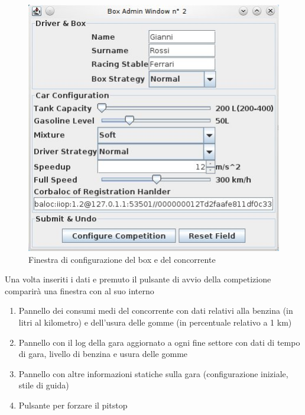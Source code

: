 \begin{center}
\begin{figure}[H]
	\includegraphics[scale=0.75]{screenshotRelazione/box2.jpeg}
	\caption{Finestra di  configurazione del box e del concorrente}
\end{figure}
\end{center}
Una volta inseriti i dati e premuto il pulsante di avvio della competizione comparir\`{a} una finestra con al suo interno 
\begin{enumerate}
\item Pannello dei consumi medi del concorrente con dati relativi alla benzina (in litri al kilometro) e dell'usura delle gomme (in percentuale relativo a 1 km)
\item Pannello con il log della gara aggiornato a ogni fine settore con dati di tempo di gara, livello di benzina e usura delle gomme
\item Pannello con altre informazioni statiche sulla gara (configurazione iniziale, stile di guida)
\item Pulsante per forzare il pitstop
\end{enumerate}
